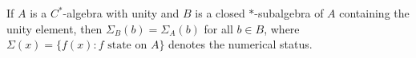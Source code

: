 If $A$ is a $C^*$-algebra with unity and $B$ is a closed $*$-subalgebra of $A$ containing the unity element, then $\Sigma_B(b) = \Sigma_A(b)$ for all $b \in B$, where $\Sigma(x) = \{f(x): f \text{ state on } A\}$ denotes the numerical status.
